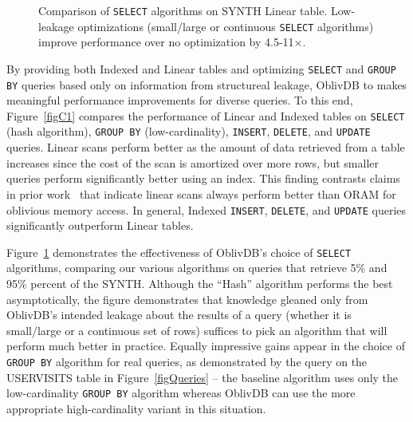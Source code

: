 \documentclass[letterpaper,twocolumn,10pt]{article}
\def\name/{OblivDB}
\begin{document}
\begin{figure}
\centering
{}
\caption{Comparison of \texttt{SELECT} algorithms on SYNTH Linear table. Low-leakage optimizations (small/large or continuous \texttt{SELECT} algorithms) improve performance over no optimization by 4.5-11$\times$.} 
\label{figC3}
\end{figure}

By providing both Indexed and Linear tables and optimizing \texttt{SELECT} and \texttt{GROUP BY} queries based only on information from structureal leakage, \name/ to makes meaningful performance improvements for diverse queries. To this end, Figure~\ref{figC1} compares the performance of Linear and Indexed tables on \texttt{SELECT} (hash algorithm), \texttt{GROUP BY} (low-cardinality), \texttt{INSERT}, \texttt{DELETE}, and \texttt{UPDATE} queries. Linear scans perform better as the amount of data retrieved from a table increases since the cost of the scan is amortized over more rows, but smaller queries perform significantly better using an index. This finding contrasts claims in prior work~\cite{RLT15} that indicate linear scans always perform better than ORAM for oblivious memory access. In general, Indexed \texttt{INSERT}, \texttt{DELETE}, and \texttt{UPDATE} queries significantly outperform Linear tables.

Figure~\ref{figC3} demonstrates the effectiveness of \name/'s choice of \texttt{SELECT} algorithms, comparing our various algorithms on queries that retrieve 5\% and 95\% percent of the SYNTH. Although the ``Hash'' algorithm performs the best asymptotically, the figure demonstrates that knowledge gleaned only from \name/'s intended leakage about the results of a query (whether it is small/large or a continuous set of rows) suffices to pick an algorithm that will perform much better in practice. Equally impressive gains appear in the choice of \texttt{GROUP BY} algorithm for real queries, as demonstrated by the query on the USERVISITS table in Figure~\ref{figQueries} -- the baseline algorithm uses only the low-cardinality \texttt{GROUP BY} algorithm whereas \name/ can use the more appropriate high-cardinality variant in this situation. 
\end{document}
